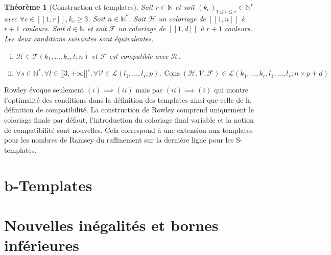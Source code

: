\documentclass{article}
\newtheorem{theorem}[definition]{Théorème}
\DeclareMathOperator{\cons}{Cons}
\begin{document}
\begin{theorem}[Construction et templates]
\label{thm:temp}
Soit \(r \in \mathbb{N}\) et soit \((k_c)_{1 \leqslant c \leqslant r} \in \mathbb{N}^r\) avec \(\forall c \in [\![1,r]\!], k_c \geqslant 3\). Soit \(n \in \mathbb{N}^*\). Soit \(\mathcal{H}\) un coloriage de \([\![1,n]\!]\) à \(r + 1\) couleurs. Soit \(d \in \mathbb{N}\) et soit \(\mathcal{F}\) un coloriage de \([\![1, d]\!]\) à \(r + 1\) couleurs. Les deux conditions suivantes sont équivalentes.

\begin{enumerate}[(i)]
\item \(\mathcal{H} \in \mathcal{T}(k_1, ..., k_r, t; n)\) et \(\mathcal{F}\) est compatible  avec \(\mathcal{H}\).
\item \(\forall s \in \mathbb{N}^*, \forall l \in {[\![3, +\infty[\![}^s, \forall \mathcal{V} \in \mathcal{L}(l_1, ..., l_s ; p), \cons(\mathcal{H}, \mathcal{V}, \mathcal{F}) \in  \mathcal{L}(k_1, ..., k_r, l_1, ..., l_s ; n \times p + d)\)
\end{enumerate}
\end{theorem}

Rowley évoque seulement \((i) \implies (ii)\) mais pas \((ii) \implies (i)\) qui montre l'optimalité des conditions dans la définition des templates ainsi que celle de la définition de compatibilité.
La construction de Rowley comprend uniquement le coloriage finale par défaut, l'introduction du coloriage final variable et la notion de compatibilité sont nouvelles. Cela correspond à une extension aux templates pour les nombres de Ramsey du raffinement sur la dernière ligne pour les S-templates.
\section{b-Templates}
\label{sec:b-temp}

\section{Nouvelles inégalités et bornes inférieures}
\label{sec:results}



\end{document}
